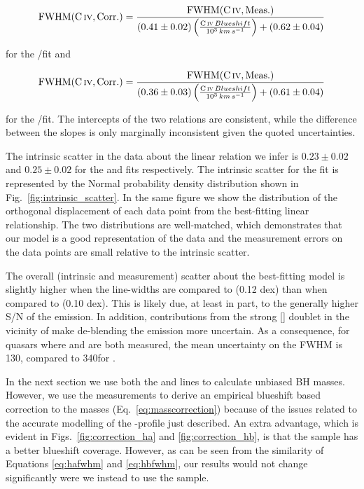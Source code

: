 \begin{equation}
    \label{eq:hafwhm}
    \mathrm{FWHM}(\mathrm{C}\,\textsc{iv}, \mathrm{Corr.}) = \frac{\mathrm{FWHM}(\mathrm{C}\,\textsc{iv}, \mathrm{Meas.})}{ (0.41\pm0.02) \left(\frac{\mathrm{C}\,\textsc{iv}\, Blueshift}{10^3 {\mathrm \,km\,s^{-1}}} \right) + (0.62\pm0.04)}
\end{equation}

\noindent for the /\ha fit and 

\begin{equation}
    \label{eq:hbfwhm}
    \mathrm{FWHM}(\mathrm{C}\,\textsc{iv}, \mathrm{Corr.}) = \frac{\mathrm{FWHM}(\mathrm{C}\,\textsc{iv}, \mathrm{Meas.})}{ (0.36\pm0.03) \left(\frac{\mathrm{C}\,\textsc{iv}\, Blueshift}{10^3 {\mathrm \,km\,s^{-1}}} \right) + (0.61\pm0.04)}
\end{equation}

\noindent for the /\hb fit. 
The intercepts of the two relations are consistent, while the difference between the slopes is only marginally inconsistent given the quoted uncertainties. 

The intrinsic scatter in the data about the linear relation we infer is $0.23 \pm 0.02$ and $0.25 \pm 0.02$ for the \ha and \hb fits respectively. 
The intrinsic scatter for the \ha fit is represented by the Normal probability density distribution shown in Fig.~\ref{fig:intrinsic_scatter}. 
In the same figure we show the distribution of the orthogonal displacement of each data point from the best-fitting linear relationship. 
The two distributions are well-matched, which demonstrates that our model is a good representation of the data and the measurement errors on the data points are small relative to the intrinsic scatter.    

The overall (intrinsic and measurement) scatter about the best-fitting model is slightly higher when the  line-widths are compared to \hb (0.12 dex) than when compared to \ha (0.10 dex). 
This is likely due, at least in part, to the generally higher S/N of the \ha emission. 
In addition, contributions from the strong [] doublet in the vicinity of \hb make de-blending the \hb emission more uncertain. 
As a consequence, for quasars where \ha and \hb are both measured, the mean uncertainty on the \ha FWHM is 130\kms, compared to 340\kms for \hbns. 

In the next section we use both the \ha and \hb lines to calculate unbiased BH masses. 
However, we use the \ha measurements to derive an empirical  blueshift based correction to the  masses (Eq.~\ref{eq:masscorrection}) because of the issues related to the accurate modelling of the \hbns-profile just described.  
An extra advantage, which is evident in Figs.~\ref{fig:correction_ha} and \ref{fig:correction_hb}, is that the \ha sample has a better  blueshift coverage. 
However, as can be seen from the similarity of Equations \ref{eq:hafwhm} and \ref{eq:hbfwhm}, our results would not change significantly were we instead to use the \hb sample. 

